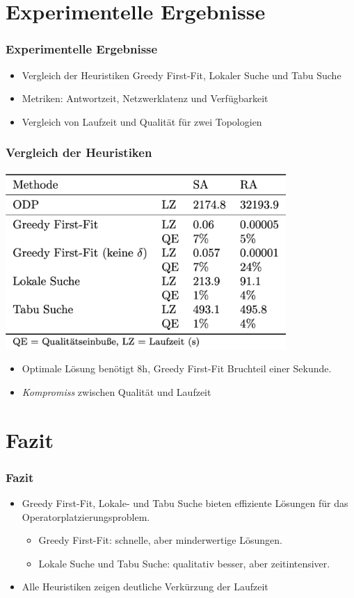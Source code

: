 \documentclass{beamer}
\begin{document}
\section{Experimentelle Ergebnisse}
\begin{frame}
\frametitle{Experimentelle Ergebnisse}
\begin{itemize}
    \item Vergleich der Heuristiken Greedy First-Fit, Lokaler Suche und Tabu Suche
    \item Metriken: Antwortzeit, Netzwerklatenz und Verfügbarkeit
    \item Vergleich von Laufzeit und Qualität für zwei Topologien
\end{itemize}
\vspace{0.3cm}
\end{frame}

\begin{frame}
\frametitle{Vergleich der Heuristiken}

\begin{center}
    \includegraphics[width=0.8\textwidth]{res/evaluation.png} 
\end{center}

\begin{itemize}
    \item Optimale Lösung benötigt 8h, Greedy First-Fit Bruchteil einer Sekunde.
    \item  \textit{Kompromiss} zwischen Qualität und Laufzeit
\end{itemize}
\end{frame}

\section{Fazit}
\begin{frame}
\frametitle{Fazit}
\begin{itemize}
    \item Greedy First-Fit, Lokale- und Tabu Suche bieten effiziente Lösungen für das Operatorplatzierungsproblem.
    \begin{itemize}
        \item Greedy First-Fit: schnelle, aber minderwertige Lösungen.
        \item Lokale Suche und Tabu Suche: qualitativ besser, aber zeitintensiver.
    \end{itemize}
    \item Alle Heuristiken zeigen deutliche Verkürzung der Laufzeit
\end{itemize}
\end{frame}
\end{document}
